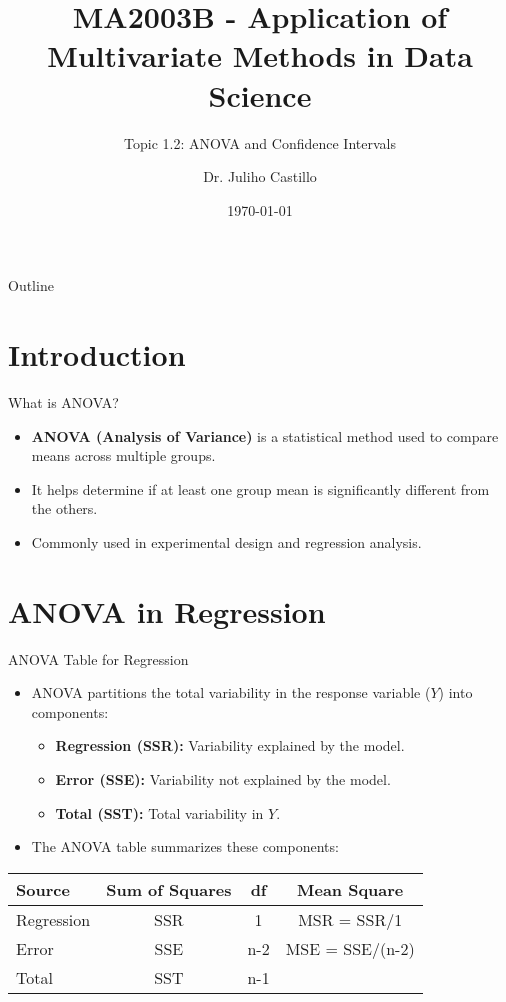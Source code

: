 \documentclass[aspectratio=169]{beamer}
\title[ANOVA \& Confidence Intervals]{MA2003B - Application of Multivariate Methods in Data Science}
\subtitle{Topic 1.2: ANOVA and Confidence Intervals}
\author{Dr. Juliho Castillo}
\institute{Tec de Monterrey}
\date{\today}
\begin{document}
\begin{frame}
  \titlepage
\end{frame}

\begin{frame}{Outline}
  \tableofcontents
\end{frame}

\section{Introduction}
\begin{frame}{What is ANOVA?}
  \begin{itemize}
    \item \textbf{ANOVA (Analysis of Variance)} is a statistical method used to compare means across multiple groups.
    \item It helps determine if at least one group mean is significantly different from the others.
    \item Commonly used in experimental design and regression analysis.
  \end{itemize}
\end{frame}

\section{ANOVA in Regression}
\begin{frame}{ANOVA Table for Regression}
  \begin{itemize}
    \item ANOVA partitions the total variability in the response variable ($Y$) into components:
    \begin{itemize}
      \item \textbf{Regression (SSR):} Variability explained by the model.
      \item \textbf{Error (SSE):} Variability not explained by the model.
      \item \textbf{Total (SST):} Total variability in $Y$.
    \end{itemize}
    \item The ANOVA table summarizes these components:
  \end{itemize}
  \begin{center}
    \begin{tabular}{lccc}
      Source & Sum of Squares & df & Mean Square \\
      \hline
      Regression & SSR & 1 & MSR = SSR/1 \\
      Error & SSE & n-2 & MSE = SSE/(n-2) \\
      Total & SST & n-1 & \\
    \end{tabular}
  \end{center}
\end{frame}
\end{document}
